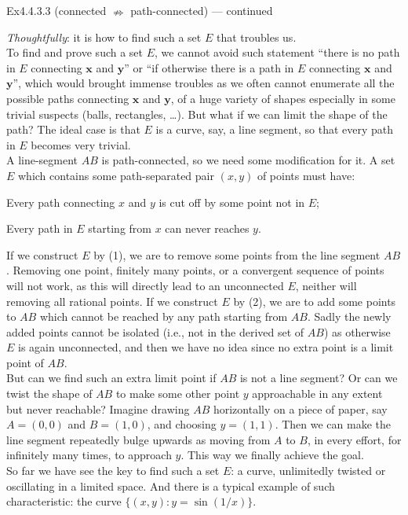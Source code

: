 \documentclass{article}
\begin{document}
\begin{Th}{Ex4.4.3.3 (connected $\nRightarrow$ path-connected) — continued}
    \textcolor{P}{\textit{Thoughtfully}: it is how to find such a set $E$ that troubles us.\\
    To find and prove such a set $E$, we cannot avoid such statement ``there is no path in $E$ connecting $\pmb{x}$ and $\pmb{y}$'' or ``if otherwise there is a path in $E$ connecting $\pmb{x}$ and $\pmb{y}$'', which would brought immense troubles as we often cannot enumerate all the possible paths connecting $\pmb{x}$ and $\pmb{y}$, of a huge variety of shapes especially in some trivial suspects (balls, rectangles, \dots). But what if we can limit the shape of the path? The ideal case is that $E$ is a curve, say, a line segment, so that every path in $E$ becomes very trivial.\\
    A line-segment $AB$ is path-connected, so we need some modification for it. A set $E$ which contains some path-separated pair $(x,y)$ of points must have:
    \begin{compactenum}
        \item Every path connecting $x$ and $y$ is cut off by some point not in $E$;
        \item Every path in $E$ starting from $x$ can never reaches $y$.
    \end{compactenum}
    If we construct $E$ by (1), we are to remove some points from the line segment $AB$. Removing one point, finitely many points, or a convergent sequence of points will not work, as this will directly lead to an unconnected $E$, neither will removing all rational points.
    If we construct $E$ by (2), we are to add some points to $AB$ which cannot be reached by any path starting from $AB$. Sadly the newly added points cannot be isolated (i.e., not in the derived set of $AB$) as otherwise $E$ is again unconnected, and then we have no idea since no extra point is a limit point of $AB$.\\
    But can we find such an extra limit point if $AB$ is not a line segment? Or can we twist the shape of $AB$ to make some other point $y$ approachable in any extent but never reachable? Imagine drawing $AB$ horizontally on a piece of paper, say $A=(0,0)$ and $B=(1,0)$, and choosing $y=(1,1)$. Then we can make the line segment repeatedly bulge upwards as moving from $A$ to $B$, in every effort, for infinitely many times, to approach $y$. This way we finally achieve the goal.\\
    So far we have see the key to find such a set $E$: a curve, unlimitedly twisted or oscillating in a limited space. And there is a typical example of such characteristic: the curve $\{(x,y): y=\sin(1/x)\}$.}
\end{Th}
\end{document}
